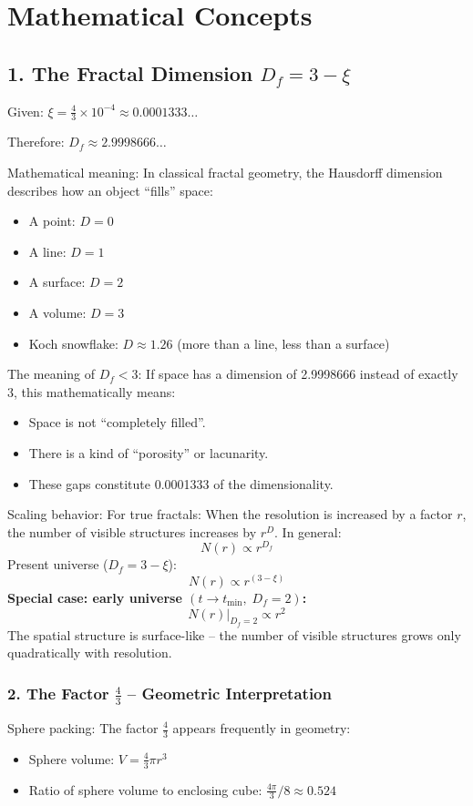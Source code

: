 	\section{Mathematical Concepts}
	
	\subsection{1. The Fractal Dimension \( D_f = 3 - \xi \)}
	Given: \( \xi = \frac{4}{3} \times 10^{-4} \approx 0.0001333\ldots \)
	
	Therefore: \( D_f \approx 2.9998666\ldots \)
	
	Mathematical meaning:
	In classical fractal geometry, the Hausdorff dimension describes how an object ``fills'' space:
	\begin{itemize}
		\item A point: \( D = 0 \)
		\item A line: \( D = 1 \)
		\item A surface: \( D = 2 \)
		\item A volume: \( D = 3 \)
		\item Koch snowflake: \( D \approx 1.26 \) (more than a line, less than a surface)
	\end{itemize}
	
	The meaning of \( D_f < 3 \):
	If space has a dimension of 2.9998666 instead of exactly 3, this mathematically means:
	\begin{itemize}
		\item Space is not ``completely filled''.
		\item There is a kind of ``porosity'' or lacunarity.
		\item These gaps constitute 0.0001333 of the dimensionality.
	\end{itemize}
	
	Scaling behavior:
	For true fractals: When the resolution is increased by a factor \( r \), the number of visible structures increases by \( r^D \). In general:
	\[
	N(r) \propto r^{D_f}
	\]
	Present universe (\( D_f = 3 - \xi \)):
	\[
	N(r) \propto r^{(3-\xi)}
	\]
	\textbf{Special case: early universe \((t \to t_{\min},\; D_f = 2)\):}
	\[
	N(r)\big|_{D_f=2} \propto r^{2}
	\]
	The spatial structure is surface-like -- the number of visible structures grows only quadratically with resolution.
	
	\subsubsection{2. The Factor \( \frac{4}{3} \) – Geometric Interpretation}
	Sphere packing:
	The factor \( \frac{4}{3} \) appears frequently in geometry:
	\begin{itemize}
		\item Sphere volume: \( V = \frac{4}{3}\pi r^3 \)
		\item Ratio of sphere volume to enclosing cube: \( \frac{4\pi}{3}/8 \approx 0.524 \)
	\end{itemize}
	
